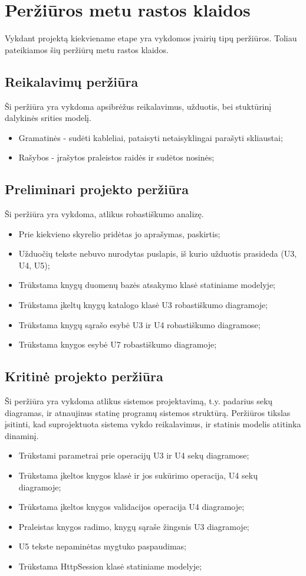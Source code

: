 \documentclass{VUMIFPSkursinis}
\begin{document}
\section{Peržiūros metu rastos klaidos}
	Vykdant projektą kiekviename etape yra vykdomos įvairių tipų peržiūros.
	Toliau pateikiamos šių peržiūrų metu rastos klaidos.
	\subsection{Reikalavimų peržiūra}
		Ši peržiūra yra vykdoma apsibrėžus reikalavimus, užduotis, bei stuktūrinį dalykinės srities modelį.
		\begin{itemize}
			\item Gramatinės - sudėti kableliai, pataisyti netaisyklingai parašyti skliaustai;
			\item Rašybos - įrašytos praleistos raidės ir sudėtos nosinės;
		\end{itemize}
	\subsection{Preliminari projekto peržiūra}
		Ši peržiūra yra vykdoma, atlikus robastiškumo analizę.
		\begin{itemize}
			\item Prie kiekvieno skyrelio pridėtas jo aprašymas, paskirtis;
			\item Užduočių tekste nebuvo nurodytas puslapis, iš kurio užduotis prasideda (U3, U4, U5);
			\item Trūkstama knygų duomenų bazės atsakymo klasė statiniame modelyje;
			\item Trūkstama įkeltų knygų katalogo klasė U3 robastiškumo diagramoje;
			\item Trūkstama knygų sąrašo esybė U3 ir U4 robastiškumo diagramose;
			\item Trūkstama knygos esybė U7 robastiškumo diagramoje;
		\end{itemize}
	\subsection{Kritinė projekto peržiūra}
		Ši peržiūra yra vykdoma atlikus sistemos projektavimą,
		t.y. padarius sekų diagramas, ir atnaujinus statinę programų sistemos struktūrą.
		Peržiūros tikslas įsitinti, kad suprojektuota sistema vykdo reikalavimus,
		ir statinis modelis atitinka dinaminį.
		\begin{itemize}
			\item Trūkstami parametrai prie operacijų U3 ir U4 sekų diagramose;
			\item Trūkstama įkeltos knygos klasė ir jos sukūrimo operacija, U4 sekų diagramoje;
			\item Trūkstama įkeltos knygos validacijos operacija U4 diagramoje;
			\item Praleistas knygos radimo, knygų sąraše žingsnis U3 diagramoje;
			\item U5 tekste nepaminėtas mygtuko paspaudimas;
			\item Trūkstama HttpSession klasė statiniame modelyje;
		\end{itemize}
\setcounter{secnumdepth}{0}
\end{document}
